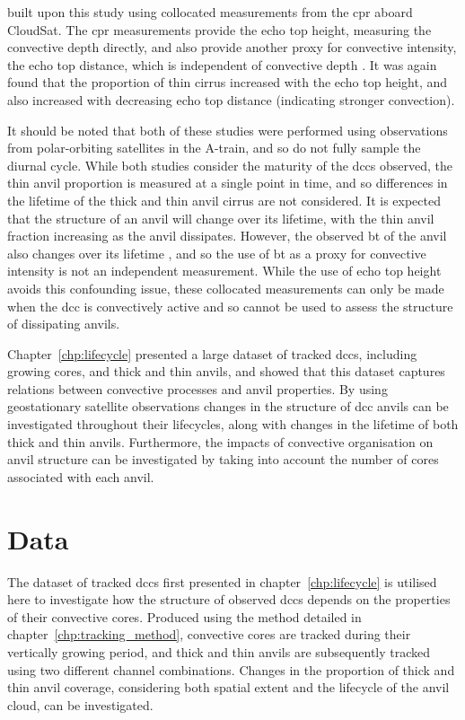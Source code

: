 \citet{takahashi_relationships_2017} built upon this study using collocated measurements from the \acrfull{cpr} aboard CloudSat.
The \acrshort{cpr} measurements provide the echo top height, measuring the convective depth directly, and also provide another proxy for convective intensity, the echo top distance, which is independent of convective depth \citep{takahashi_characterizing_2014}.
It was again found that the proportion of thin cirrus increased with the echo top height, and also increased with decreasing echo top distance (indicating stronger convection).

It should be noted that both of these studies were performed using observations from polar-orbiting satellites in the A-train, and so do not fully sample the diurnal cycle.
While both studies consider the maturity of the \acrshort{dcc}s observed, the thin anvil proportion is measured at a single point in time, and so differences in the lifetime of the thick and thin anvil cirrus are not considered.
It is expected that the structure of an anvil will change over its lifetime, with the thin anvil fraction increasing as the anvil dissipates.
However, the observed \acrshort{bt} of the anvil also changes over its lifetime \citep{futyan_deep_2007}, and so the use of \acrshort{bt} as a proxy for convective intensity is not an independent measurement.
While the use of echo top height avoids this confounding issue, these collocated measurements can only be made when the \acrfull{dcc} is convectively active and so cannot be used to assess the structure of dissipating anvils.

Chapter~\ref{chp:lifecycle} presented a large dataset of tracked \acrshort{dcc}s, including growing cores, and thick and thin anvils, and showed that this dataset captures relations between convective processes and anvil properties.
By using geostationary satellite observations changes in the structure of \acrshort{dcc} anvils can be investigated throughout their lifecycles, along with changes in the lifetime of both thick and thin anvils.
Furthermore, the impacts of convective organisation on anvil structure can be investigated by taking into account the number of cores associated with each anvil.


\section{Data}

The dataset of tracked \acrshort{dcc}s first presented in chapter~\ref{chp:lifecycle} is utilised here to investigate how the structure of observed \acrshort{dcc}s depends on the properties of their convective cores.
Produced using the method detailed in chapter~\ref{chp:tracking_method}, convective cores are tracked during their vertically growing period, and thick and thin anvils are subsequently tracked using two different channel combinations.
Changes in the proportion of thick and thin anvil coverage, considering both spatial extent and the lifecycle of the anvil cloud, can be investigated.

